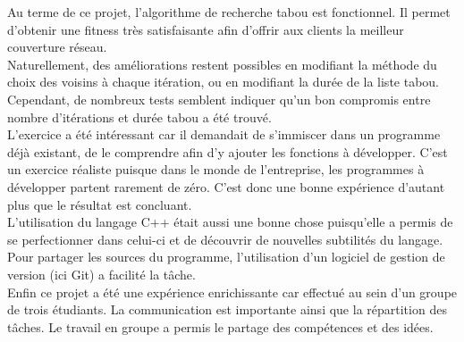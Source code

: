 \documentclass[a4paper, 11pt]{report}
\begin{document}
Au terme de ce projet, l'algorithme de recherche tabou est fonctionnel. Il permet d'obtenir une fitness très satisfaisante afin d'offrir aux clients la meilleur couverture réseau.\\
Naturellement, des améliorations restent possibles en modifiant la méthode du choix des voisins à chaque itération, ou en modifiant la durée de la liste tabou. Cependant, de nombreux tests semblent indiquer qu'un bon compromis entre nombre d'itérations et durée tabou a été trouvé.\\
L'exercice a été intéressant car il demandait de s'immiscer dans un programme déjà existant, de le comprendre afin d'y ajouter les fonctions à développer. C'est un exercice réaliste puisque dans le monde de l'entreprise, les programmes à développer partent rarement de zéro. C'est donc une bonne expérience d'autant plus que le résultat est concluant.\\
L'utilisation du langage C++ était aussi une bonne chose puisqu'elle a permis de se perfectionner dans celui-ci et de découvrir de nouvelles subtilités du langage. Pour partager les sources du programme, l'utilisation d'un logiciel de gestion de version (ici Git) a facilité la tâche.\\
Enfin ce projet a été une expérience enrichissante car effectué au sein d'un groupe de trois étudiants. La communication est importante ainsi que la répartition des tâches. Le travail en groupe a permis le partage des compétences et des idées. \\

\newpage
\tableofcontents
\end{document}
